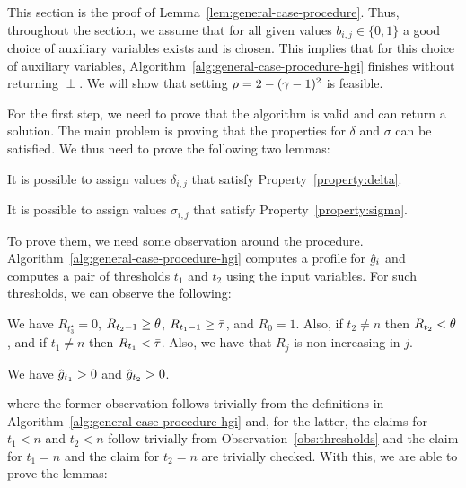 This section is the proof of Lemma~\ref{lem:general-case-procedure}. Thus, 
throughout the section, we assume that for all given values $b_{i,j} \in \{0, 1\}$ a good choice of auxiliary variables exists and is chosen. This implies that for this choice of auxiliary variables, Algorithm~\ref{alg:general-case-procedure-hgi} finishes without returning $\perp$. We will show that setting $\rho=2-(\gamma-1)^2$ is feasible.

For the first step, we need to prove that the algorithm is valid and can return a solution. The main problem is proving that the properties for $\delta$ and $\sigma$ can be satisfied. We thus need to prove the following two lemmas:
\begin{lemma}\label{lem:delta-existence}
It is possible to assign values $\delta_{i,j}$ that satisfy Property~\ref{property:delta}.
\end{lemma}
\begin{lemma}\label{lem:sigma-existence}
It is possible to assign values $\sigma_{i,j}$ that satisfy Property~\ref{property:sigma}.
\end{lemma}
To prove them, we need some observation around the procedure. Algorithm~\ref{alg:general-case-procedure-hgi} computes a profile for $\hat{g}_i$ and computes a pair of thresholds $t_1$ and $t_2$ using the input variables. For such thresholds, we can observe the following:
\begin{observation}
\label{obs:thresholds}
We have $R_{t_3^\star} = 0$, $R_{t_2 - 1} \geq \theta$, $R_{t_1 - 1} \geq \bar\tau$, and $R_0 = 1$. Also, if $t_2 \neq n$ then $R_{t_2} < \theta$, and if $t_1 \neq n$ then $R_{t_1} < \bar\tau$.
Also, we have that $R_j$ is non-increasing in $j$.
\end{observation}
\begin{observation}
We have $\hat{g}_{t_1} > 0$ and $\hat{g}_{t_2} > 0$.
\end{observation}
where the former observation follows trivially from the definitions in Algorithm~\ref{alg:general-case-procedure-hgi} and, for the latter, the claims for $t_1 < n$ and $t_2 < n$ follow trivially from Observation~\ref{obs:thresholds} and the claim for $t_1 = n$ and the claim for $t_2 = n$ are trivially checked. With this, we are able to prove the lemmas:
